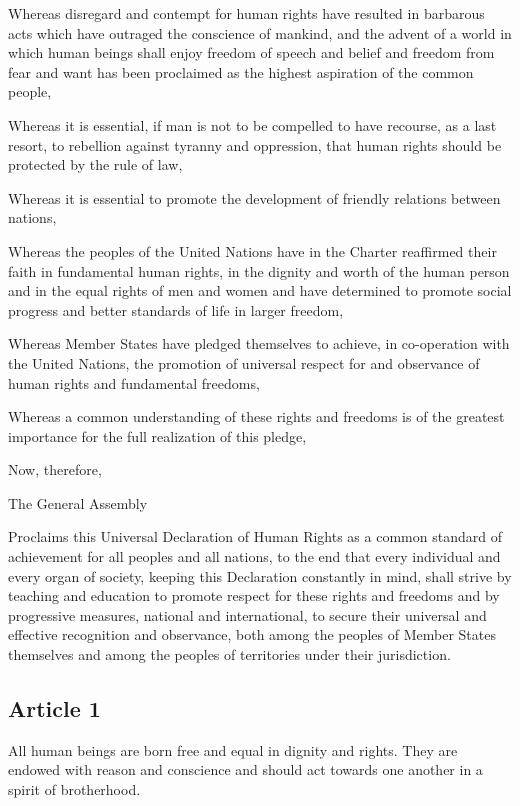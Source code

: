 \documentclass[
  titlepage,
  openright,
  DIV=calc,
  toc=listof,
  listof=nochaptergap]{scrbook}
\begin{document}
Whereas disregard and contempt for human rights have resulted in
barbarous acts which have outraged the conscience of mankind, and the
advent of a world in which human beings shall enjoy freedom of speech
and belief and freedom from fear and want has been proclaimed as the
highest aspiration of the common people,

Whereas it is essential, if man is not to be compelled to have recourse,
as a last resort, to rebellion against tyranny and oppression, that
human rights should be protected by the rule of law,

Whereas it is essential to promote the development of friendly relations
between nations,

Whereas the peoples of the United Nations have in the Charter reaffirmed
their faith in fundamental human rights, in the dignity and worth of the
human person and in the equal rights of men and women and have
determined to promote social progress and better standards of life in
larger freedom,

Whereas Member States have pledged themselves to achieve, in
co-operation with the United Nations, the promotion of universal respect
for and observance of human rights and fundamental freedoms,

Whereas a common understanding of these rights and freedoms is of the
greatest importance for the full realization of this pledge,

Now, therefore,

The General Assembly

Proclaims this Universal Declaration of Human Rights as a common
standard of achievement for all peoples and all nations, to the end that
every individual and every organ of society, keeping this Declaration
constantly in mind, shall strive by teaching and education to promote
respect for these rights and freedoms and by progressive measures,
national and international, to secure their universal and effective
recognition and observance, both among the peoples of Member States
themselves and among the peoples of territories under their
jurisdiction.

\subsection{Article 1}\label{article-1-1}

All human beings are born free and equal in dignity and rights. They are
endowed with reason and conscience and should act towards one another in
a spirit of brotherhood.
\end{document}

